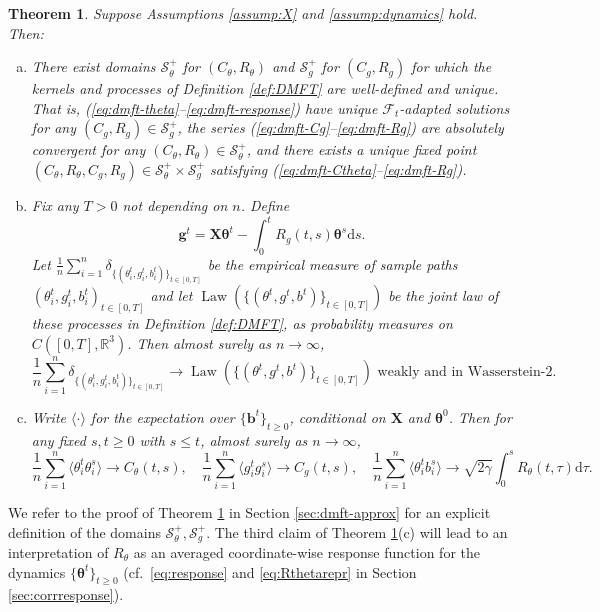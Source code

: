 \documentclass[11pt,letterpaper,reqno]{amsart}
\def\R{\mathbb{R}}
\def\d{\mathrm{d}}
\def\btheta{\boldsymbol{\theta}}
\def\X{\mathbf{X}}
\def\b{\mathbf{b}}
\def\g{\mathbf{g}}
\def\cF{\mathcal{F}}
\def\cS{\mathcal{S}}
\def\Law{\operatorname{Law}}
\newtheorem{theorem}{Theorem}[section]
\theoremstyle{definition}
\numberwithin{equation}{section}
\begin{document}
\begin{theorem}\label{thm:dmft-approx}
Suppose Assumptions \ref{assump:X} and \ref{assump:dynamics} hold. Then:
\begin{enumerate}[(a)]
\item There exist domains $\cS_\theta^+$ for $(C_\theta,R_\theta)$ and 
$\cS_g^+$ for $(C_g,R_g)$ for which the kernels and processes of
Definition \ref{def:DMFT} are well-defined and unique.
That is, (\ref{eq:dmft-theta}--\ref{eq:dmft-response}) have unique
$\cF_t$-adapted solutions for any $(C_g,R_g) \in \cS_g^+$,
the series (\ref{eq:dmft-Cg}--\ref{eq:dmft-Rg}) are absolutely convergent for
any $(C_\theta,R_\theta) \in \cS_\theta^+$, and there exists a
unique fixed point $(C_\theta,R_\theta,C_g,R_g) \in \cS_\theta^+
\times \cS_g^+$ satisfying (\ref{eq:dmft-Ctheta}--\ref{eq:dmft-Rg}).
\item Fix any $T>0$ not depending on $n$. Define
\[\g^t=\X\btheta^t-\int_0^t R_g(t,s)\btheta^s\d s.\]
Let $\frac{1}{n}\sum_{i=1}^n \delta_{\{(\theta_i^t,g_i^t,b_i^t)\}_{t \in
[0,T]}}$ be the empirical measure of sample paths
$(\theta_i^t,g_i^t,b_i^t)_{t \in [0,T]}$ and let
$\Law(\{(\theta^t,g^t,b^t)\}_{t \in [0,T]})$ be the joint law of these 
processes in Definition \ref{def:DMFT}, as probability measures on
$C([0,T],\R^3)$. Then almost surely
as $n \to \infty$,
\[\frac{1}{n}\sum_{i=1}^n \delta_{\{(\theta_i^t,g_i^t,b_i^t)\}_{t \in [0,T]}}
\to \Law(\{(\theta^t,g^t,b^t)\}_{t \in [0,T]}) \text{ weakly and in
Wasserstein-2.}\]
\item Write $\langle \cdot \rangle$ for the expectation over $\{\b^t\}_{t \geq
0}$, conditional on $\X$ and $\btheta^0$. Then for any fixed $s,t \geq 0$
with $s \leq t$, almost surely as $n \to \infty$,
\[\frac{1}{n}\sum_{i=1}^n \langle \theta_i^t\theta_i^s \rangle
\to C_\theta(t,s), \quad
\frac{1}{n}\sum_{i=1}^n \langle g_i^t g_i^s \rangle
\to C_g(t,s), \quad
\frac{1}{n}\sum_{i=1}^n \langle \theta_i^tb_i^s
\rangle \to \sqrt{2\gamma}\int_0^s R_\theta(t,\tau) \d \tau.\]
\end{enumerate}
\end{theorem}

We refer to the proof of Theorem \ref{thm:dmft-approx} in Section \ref{sec:dmft-approx} for an explicit definition of the domains $\cS_\theta^+,\cS_g^+$. The third claim of Theorem \ref{thm:dmft-approx}(c) will lead to an interpretation of $R_\theta$ as an averaged coordinate-wise response function for the dynamics $\{\btheta^t\}_{t \geq 0}$ (cf.\ \eqref{eq:response} and \eqref{eq:Rthetarepr} in Section \ref{sec:corrresponse}).
\end{document}
